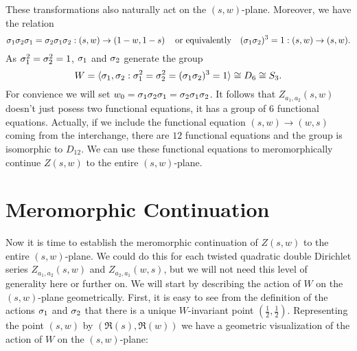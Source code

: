\documentclass[12pt,reqno,oneside]{amsart}
\begin{document}
    These transformations also naturally act on the $(s,w)$-plane. Moreover, we have the relation
    \[
        \sigma_{1}\sigma_{2}\sigma_{1} = \sigma_{2}\sigma_{1}\sigma_{2}:(s,w) \to \left(1-w,1-s\right) \quad \text{or equivalently} \quad (\sigma_{1}\sigma_{2})^{3} = 1:(s,w) \to (s,w).
    \]
    As $\sigma_{1}^{2} = \sigma_{2}^{2} = 1$, $\sigma_{1}$ and $\sigma_{2}$ generate the group
    \[
        W = \langle\sigma_{1},\sigma_{2}:\sigma_{1}^{2} = \sigma_{2}^{2} = (\sigma_{1}\sigma_{2})^{3} = 1\rangle \cong D_{6} \cong S_{3}.
    \]
    For convience we will set $w_{0} = \sigma_{1}\sigma_{2}\sigma_{1} = \sigma_{2}\sigma_{1}\sigma_{2}$. It follows that $Z_{a_{1},a_{2}}(s,w)$ doesn't just posess two functional equations, it has a group of $6$ functional equations. Actually, if we include the functional equation $(s,w) \to (w,s)$ coming from the interchange, there are $12$ functional equations and the group is isomorphic to $D_{12}$. We can use these functional equations to meromorphically continue $Z(s,w)$ to the entire $(s,w)$-plane.
\section{Meromorphic Continuation}
    Now it is time to establish the meromorphic continuation of $Z(s,w)$ to the entire $(s,w)$-plane. We could do this for each twisted quadratic double Dirichlet series $Z_{a_{1},a_{2}}(s,w)$ and $Z_{a_{2},a_{1}}(w,s)$, but we will not need this level of generality here or further on. We will start by describing the action of $W$ on the $(s,w)$-plane geometrically. First, it is easy to see from the definition of the actions $\sigma_{1}$ and $\sigma_{2}$ that there is a unique $W$-invariant point $\left(\frac{1}{2},\frac{1}{2}\right)$. Representing the point $(s,w)$ by $(\Re(s),\Re(w))$ we have a geometric visualization of the action of $W$ on the $(s,w)$-plane:

    \begin{center}
    \end{center}
\end{document}
